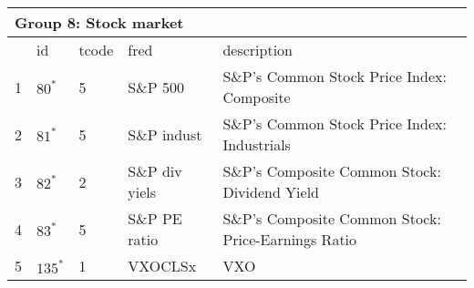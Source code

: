 \begin{table}[ht] 
\centering 
\begin{tabular}{lllll}
\multicolumn{5}{l}{Group 8: Stock market} \\
\toprule
 & id & tcode & fred & description \\
\midrule
1 & $80^*$ & 5 & S\&P 500 & S\&P's Common Stock Price Index: Composite \\
2 & $81^*$ & 5 & S\&P indust & S\&P's Common Stock Price Index: Industrials \\
3 & $82^*$ & 2 & S\&P div yiels & S\&P's Composite Common Stock: Dividend Yield \\
4 & $83^*$ & 5 & S\&P PE ratio & S\&P's Composite Common Stock: Price-Earnings Ratio \\
\rowcolor{Maroon} 5 & $135^*$ & 1 & VXOCLSx & VXO \\
\bottomrule
\end{tabular}  
\end{table} 